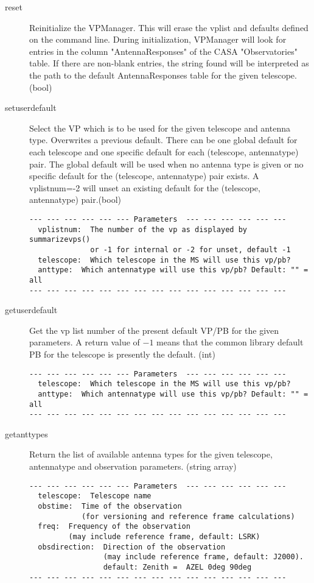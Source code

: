 \documentclass[12pt]{article}
\begin{document}
\begin{description}
  \item[reset]
   Reinitialize the VPManager. This will erase the vplist and defaults defined on the command line.
   During initialization, VPManager will look for entries in the column "AntennaResponses"
   of the CASA "Observatories" table. If there are non-blank entries, the string found will be
   interpreted as the path to the default AntennaResponses table for the given telescope. 
   (bool)

  \item[setuserdefault]
   Select the VP which is to be used for the given telescope and antenna type.
   Overwrites a previous default. 
   There can be one global default for each telescope and one specific default
   for each (telescope, antennatype) pair. The global default will be used when
   no antenna type is given or no specific default for the (telescope, antennatype) 
   pair exists. A vplistnum=-2 will unset an existing default for the 
   (telescope, antennatype) pair.(bool)

{\small
\begin{verbatim}
--- --- --- --- --- --- Parameters  --- --- --- --- --- ---
  vplistnum:  The number of the vp as displayed by summarizevps() 
              or -1 for internal or -2 for unset, default -1 
  telescope:  Which telescope in the MS will use this vp/pb? 
  anttype:  Which antennatype will use this vp/pb? Default: "" = all 
--- --- --- --- --- --- --- --- --- --- --- --- --- --- ---
\end{verbatim} 
} 


  \item[getuserdefault]
   Get the vp list number of the present default VP/PB for the given parameters.
   A return value of $-1$ means that the common library default PB for the telescope 
   is presently the default. (int)  
   
{\small
\begin{verbatim}
--- --- --- --- --- --- Parameters  --- --- --- --- --- ---
  telescope:  Which telescope in the MS will use this vp/pb? 
  anttype:  Which antennatype will use this vp/pb? Default: "" = all 
--- --- --- --- --- --- --- --- --- --- --- --- --- --- ---
\end{verbatim} 
} 

  \item[getanttypes]
   Return the list of available antenna types for the given telescope, antennatype
   and observation parameters. (string array)

{\small
\begin{verbatim}
--- --- --- --- --- --- Parameters  --- --- --- --- --- ---
  telescope:  Telescope name 
  obstime:  Time of the observation 
            (for versioning and reference frame calculations) 
  freq:  Frequency of the observation 
         (may include reference frame, default: LSRK) 
  obsdirection:  Direction of the observation 
                 (may include reference frame, default: J2000). 
                 default: Zenith =  AZEL 0deg 90deg 
--- --- --- --- --- --- --- --- --- --- --- --- --- --- ---
\end{verbatim} 
} 


\end{description}
\end{document}

